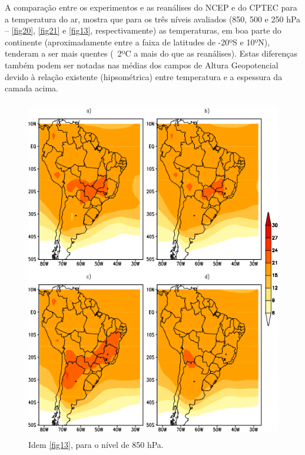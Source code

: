 A comparação entre os experimentos e as reanálises do NCEP e do CPTEC para a temperatura do ar, mostra que para os três níveis avaliados (850, 500 e 250 hPa – \autoref{fig20}, \autoref{fig21} e \autoref{fig13}, respectivamente) as temperaturas, em boa parte do continente (aproximadamente entre a faixa de latitudes de -20ºS e 10ºN), tenderam a ser mais quentes (~2ºC a mais do que as reanálises). Estas diferenças também podem ser notadas nas médias dos campos de Altura Geopotencial devido à relação existente (hipsométrica) entre temperatura e a espessura da camada acima.

\begin{figure}[!hbp]
\centering
\includegraphics[height=15cm]{./figs/media_temp_anl_850hPa.png}
\caption{Idem \autoref{fig13}, para o nível de 850 hPa.}
\label{fig20}
\end{figure}

